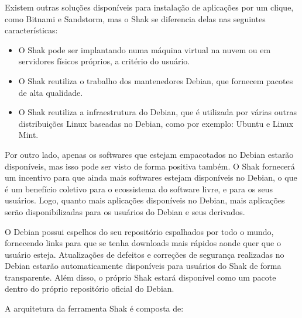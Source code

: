 Existem outras soluções disponíveis para instalação de aplicações por um clique,
como Bitnami e Sandstorm, mas o Shak se
diferencia delas nas seguintes características:

\begin{itemize}
  \item O Shak pode ser implantando numa máquina virtual na nuvem ou em servidores físicos
    próprios, a critério do usuário.

  \item O Shak reutiliza o trabalho dos mantenedores Debian, que fornecem pacotes
    de alta qualidade.

  \item O Shak reutiliza a infraestrutura do Debian, que é utilizada por várias
outras distribuições Linux baseadas no Debian, como por exemplo: Ubuntu e Linux Mint.

\end{itemize}

Por outro lado, apenas os softwares que estejam empacotados no Debian estarão
disponíveis, mas isso pode ser visto de forma positiva também. O Shak
fornecerá um incentivo para que ainda mais softwares estejam disponíveis no
Debian, o que é um benefício coletivo para o ecossistema do software livre, e
para os seus usuários. Logo, quanto mais aplicações disponíveis no Debian,
mais aplicações serão disponibilizadas para os usuários do Debian e seus derivados.

O Debian possui espelhos do seu repositório espalhados por todo o mundo,
fornecendo links para que se tenha downloads mais rápidos aonde quer que o usuário esteja.
Atualizações de defeitos e correções de segurança realizadas no Debian estarão
automaticamente disponíveis para usuários do Shak de forma transparente. Além disso,
o próprio Shak estará disponível como um pacote dentro do próprio repositório oficial do Debian.

A arquitetura da ferramenta Shak é composta de:

